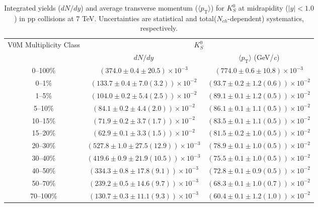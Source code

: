 \begin{table}
\caption{Integrated yields ($dN/dy$) and average transverse momentum ($\langle p_{\mathrm{T}} \rangle$) for $K^{0}_{S}$ at midrapidity ($|y|<1.0$) in pp collisions at 7 TeV. Uncertainties are statistical and total($N_{ch}$-dependent) systematics, respectively.}
\label{tab:YieldMeanK0Short_}
\begin{center}
\begin{tabular}{ c | c c }
\hline
\multirow{2}{*}{V0M Multiplicity Class} & \multicolumn{2}{c}{$K^{0}_{S}$} \\ 
& $dN/dy$ & $\langle p_{\mathrm{T}} \rangle$ (GeV/\textit{c})\\ 
\hline
0--100\% & $(374.0\pm0.4\pm20.5)\times10^{-3}$ & $(774.0\pm0.6\pm10.8)\times10^{-3}$ \\ 
0--1\% & $(133.7\pm0.4\pm7.0(3.2))\times10^{-2}$ & $(93.7\pm0.2\pm1.2(0.6))\times10^{-2}$ \\ 
1--5\% & $(104.0\pm0.2\pm5.4(2.5))\times10^{-2}$ & $(89.1\pm0.1\pm1.2(0.5))\times10^{-2}$ \\ 
5--10\% & $(84.1\pm0.2\pm4.4(2.0))\times10^{-2}$ & $(86.1\pm0.1\pm1.1(0.5))\times10^{-2}$ \\ 
10--15\% & $(71.9\pm0.2\pm3.7(1.7))\times10^{-2}$ & $(83.5\pm0.1\pm1.1(0.5))\times10^{-2}$ \\ 
15--20\% & $(62.9\pm0.1\pm3.3(1.5))\times10^{-2}$ & $(81.5\pm0.2\pm1.0(0.5))\times10^{-2}$ \\ 
20--30\% & $(527.8\pm1.0\pm27.5(12.9))\times10^{-3}$ & $(78.9\pm0.1\pm1.0(0.5))\times10^{-2}$ \\ 
30--40\% & $(419.6\pm0.9\pm21.9(10.5))\times10^{-3}$ & $(75.5\pm0.1\pm1.0(0.5))\times10^{-2}$ \\ 
40--50\% & $(334.3\pm0.8\pm17.8(9.1))\times10^{-3}$ & $(72.8\pm0.1\pm0.9(0.5))\times10^{-2}$ \\ 
50--70\% & $(239.2\pm0.5\pm14.6(9.7))\times10^{-3}$ & $(68.3\pm0.1\pm1.0(0.7))\times10^{-2}$ \\ 
70--100\% & $(130.7\pm0.3\pm11.1(9.3))\times10^{-3}$ & $(60.4\pm0.1\pm1.2(1.0))\times10^{-2}$ \\ 
\hline
\end{tabular}
\end{center}
\end{table}
 
